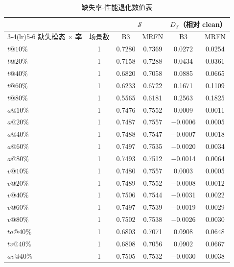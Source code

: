 \begin{table}[htbp]
  \centering\scriptsize
  \caption{缺失率-性能退化数值表}
  \label{tab:p2-degradation}
  \begin{tabularx}{\textwidth}{@{}Xccccc@{}}
    \toprule
    & & \multicolumn{2}{c}{$\mathcal{S}$} & \multicolumn{2}{c}{$D_{\mathcal{S}}$（相对 clean）} \\
    \cmidrule(lr){3-4}\cmidrule(lr){5-6}
    缺失模态 $\times$ 率 & 场景数 & B3 & MRFN & B3 & MRFN \\
    \midrule
    $t@10\%$ & 1 & 0.7280 & 0.7369 & 0.0272 & 0.0254 \\
    $t@20\%$ & 1 & 0.7158 & 0.7288 & 0.0434 & 0.0361 \\
    $t@40\%$ & 1 & 0.6820 & 0.7058 & 0.0885 & 0.0665 \\
    $t@60\%$ & 1 & 0.6233 & 0.6722 & 0.1671 & 0.1109 \\
    $t@80\%$ & 1 & 0.5565 & 0.6181 & 0.2563 & 0.1825 \\
    \midrule
    $a@10\%$ & 1 & 0.7476 & 0.7552 & 0.0009 & 0.0011 \\
    $a@20\%$ & 1 & 0.7487 & 0.7557 & $-$0.0006 & 0.0005 \\
    $a@40\%$ & 1 & 0.7488 & 0.7547 & $-$0.0007 & 0.0018 \\
    $a@60\%$ & 1 & 0.7497 & 0.7535 & $-$0.0020 & 0.0034 \\
    $a@80\%$ & 1 & 0.7493 & 0.7512 & $-$0.0014 & 0.0064 \\
    \midrule
    $v@10\%$ & 1 & 0.7480 & 0.7557 & 0.0003 & 0.0005 \\
    $v@20\%$ & 1 & 0.7489 & 0.7552 & $-$0.0008 & 0.0012 \\
    $v@40\%$ & 1 & 0.7506 & 0.7544 & $-$0.0031 & 0.0022 \\
    $v@60\%$ & 1 & 0.7497 & 0.7539 & $-$0.0019 & 0.0029 \\
    $v@80\%$ & 1 & 0.7502 & 0.7538 & $-$0.0026 & 0.0030 \\
    \midrule
    $ta@40\%$ & 1 & 0.6803 & 0.7071 & 0.0908 & 0.0648 \\
    $tv@40\%$ & 1 & 0.6808 & 0.7056 & 0.0902 & 0.0667 \\
    $av@40\%$ & 1 & 0.7505 & 0.7532 & $-$0.0030 & 0.0038 \\
    \bottomrule
  \end{tabularx}
  \par \smallskip
  \end{table}